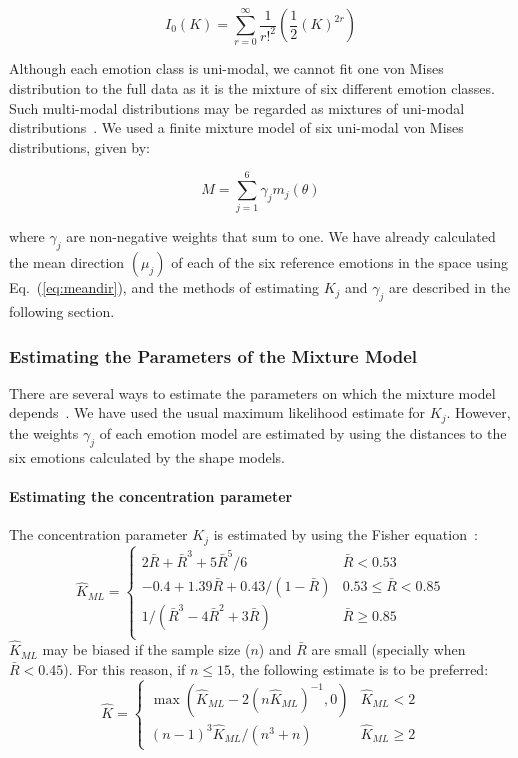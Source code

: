 \documentclass[10pt,journal,cspaper,compsoc]{IEEEtran}
\begin{document}
\begin{equation}
I_{0}(K)= \sum \limits_{r=0}^\infty \frac{1}{r!^{2}} \left(\frac{1}{2}(K)^{2r}\right)
\end{equation}

Although each emotion class is uni-modal, we cannot fit one von Mises distribution to the full data as it is the mixture of six different emotion classes. Such multi-modal distributions may be regarded as mixtures of uni-modal distributions~\cite{mardia1972statistics}. We used a finite mixture model of six uni-modal von Mises distributions, given by: 

\begin{equation}
M=\sum \limits_{j=1}^6 \gamma_{j}m_{j}(\theta)
\end{equation}

where $\gamma_{j}$ are non-negative weights that sum to one. We have already calculated the mean direction $(\mu_j)$ of each of the six reference emotions in the space using Eq.~(\ref{eq:meandir}), and the methods of estimating $K_{j}$ and $\gamma_{j}$ are described in the following section.

\subsubsection{Estimating the Parameters of the Mixture Model}
\label{sec_est_para}
There are several ways to estimate the parameters on which the mixture model depends~\cite{mardia1972statistics}. We have used the usual maximum likelihood estimate for $K_{j}$. However, the weights $\gamma_{j}$ of each emotion model are estimated by using the distances to the six emotions calculated by the shape models.

\paragraph{Estimating the concentration parameter}
\label{sec_est_kappa}
The concentration parameter $K_{j}$ is estimated by using the Fisher equation~\cite{fisher1995statistical}:
\begin{equation}
\label{eq:kappa}
\hat{K}_{ML}=\left\{ \begin{array}{ll}
2\bar{R}+\bar{R}^{3}+5\bar{R}^{5}/6 	&	 \bar{R} < 0.53 \\ 
-0.4+1.39\bar{R}+0.43/(1-\bar{R}) 		&	 0.53 \leq \bar{R} < 0.85 \\ 
1/(\bar{R}^{3}-4\bar{R}^{2}+3\bar{R}) 	&	 \bar{R} \geq 0.85 \\ 
\end{array}\right.
\end{equation}
$\hat{K}_{ML}$ may be biased if the sample size ($n$) and $\bar{R}$ are small (specially when $\bar{R}<0.45$). For this reason, if $n \leq 15$, the following estimate is to be preferred:
\begin{equation}
\hat{K}=\left\{ \begin{array}{ll}
\max(\hat{K}_{ML}-2(n\hat{K}_{ML})^{-1},0) 	&	 \hat{K}_{ML} < 2 \\ 
(n-1)^{3}\hat{K}_{ML}/(n^{3}+n) 				&	 \hat{K}_{ML} \geq 2
\end{array}\right.
\end{equation}
\end{document}
